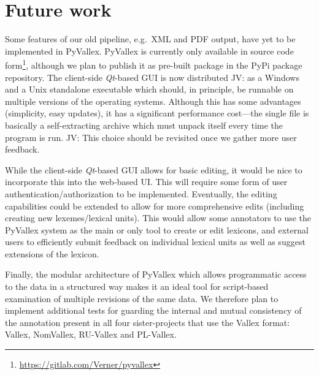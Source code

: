 \documentclass[10pt, a4paper]{article}
\newcommand{\jv}[1]{{\color{svlinks} JV: #1}}
\begin{document}
\section{Future work}
Some features of our old pipeline,
e.g.\ XML and PDF output,
have yet to be implemented in PyVallex.
PyVallex is currently only available in source code form\footnote{\url{https://gitlab.com/Verner/pyvallex}},
although we plan to publish it as pre-built
package in the PyPi package repository. The client-side \emph{Qt}-based GUI is now distributed \jv{as a Windows
and a Unix standalone executable which should, in principle, be runnable on multiple versions of the operating
systems}.
Although this has some advantages (simplicity, easy updates), it has a significant
performance cost---the single file is basically a self-extracting archive which must unpack itself
every time the program is run. \jv{This choice should be revisited once we gather more user
feedback.}

While the client-side \emph{Qt}-based GUI allows for basic editing, it would be nice to incorporate this into
the web-based UI. This will require some form of user authentication/authorization to be implemented.
Eventually, the editing capabilities could be extended to allow for more comprehensive
edits (including creating new lexemes/lexical units). This would allow some annotators
to use the PyVallex system as the main or only tool to create or edit
lexicons, and external users to efficiently submit feedback on individual lexical units as well as suggest extensions of the lexicon.

Finally, the modular architecture of PyVallex which allows programmatic access to the data in a structured
way makes it an ideal tool for script-based examination of multiple revisions of the same data.
We therefore plan to implement additional tests for guarding the internal and mutual consistency of the annotation present in all four sister-projects that use the Vallex format: Vallex, NomVallex, RU-Vallex and PL-Vallex.
\end{document}
